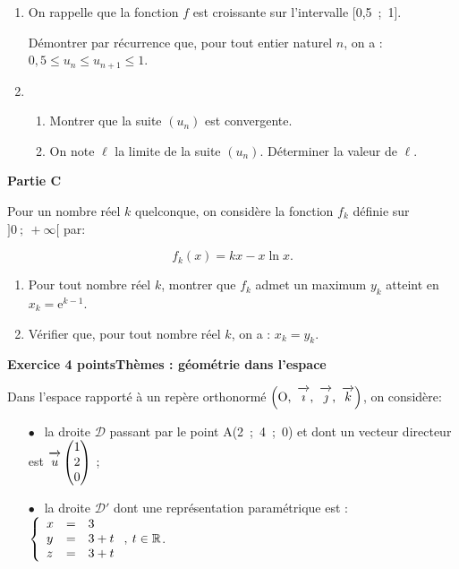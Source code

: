\documentclass[11pt]{article}
\newcommand{\R}{\mathbb{R}}
\newcommand{\vect}[1]{\overrightarrow{\,\mathstrut#1\,}}
\def\Oijk{$\left(\text{O},~\vect{\imath},~\vect{\jmath},~\vect{k}\right)$}
\begin{document}
\begin{enumerate}
\item On rappelle que la fonction $f$ est croissante sur l'intervalle [0,5~;~1].

Démontrer par récurrence que, pour tout entier naturel $n$, on a : $0,5 \leqslant  u_n \leqslant u_{n+1} \leqslant 1$.
\item 
	\begin{enumerate}
		\item Montrer que la suite $\left(u_n\right)$ est convergente.
		\item On note $\ell$ la limite de la suite $\left(u_n\right)$. Déterminer la valeur de $\ell$.
	\end{enumerate}
\end{enumerate}

\bigskip

\textbf{Partie C}

\medskip

Pour un nombre réel $k$ quelconque, on considère la fonction $f_k$ définie sur $]0~;~+\infty[$ par:

\[f_k(x) = kx - x \ln x.\]

\begin{enumerate}
\item Pour tout nombre réel $k$, montrer que $f_k$ admet un maximum $y_k$ atteint en $x_k = \text{e}^{k- 1}$.
\item  Vérifier que, pour tout nombre réel $k$, on a : $x_k = y_k$.
\end{enumerate}

\bigskip

\textbf{Exercice 4  points\hfill Thèmes : géométrie dans l'espace }

\medskip

Dans l'espace rapporté à un repère orthonormé \Oijk, on considère:

\begin{itemize}
\item[$\bullet~~$] la droite $\mathcal{D}$ passant par le point A(2~;~4~;~0) et dont un vecteur directeur est $\vect{u}\begin{pmatrix}1\\2\\0\end{pmatrix}$ ;
\item[$\bullet~~$] la droite $\mathcal{D}'$ dont une représentation paramétrique est : $\left\{\begin{array}{l c l}
x&=&3\\
y&=& 3 + t\\
z&=&3 + t
\end{array}\right. ,\: t \in \R$.
\end{itemize}
\end{document}
